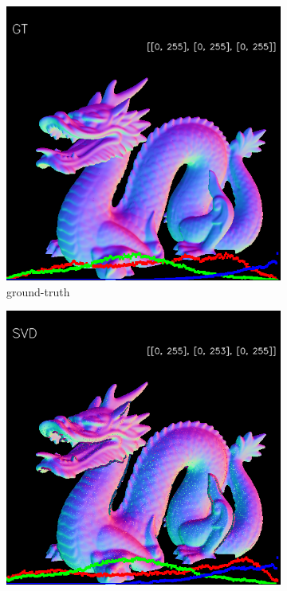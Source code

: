 \begin{figure}[h!]
	\centering
	\begin{subfigure}[b]{0.24\linewidth}
		\includegraphics[width=\linewidth]{./Figures/comparison/fancy_eval_3_groundtruth.png}
		\caption{ground-truth}
	\end{subfigure}
	\begin{subfigure}[b]{0.24\linewidth}
		\includegraphics[width=\linewidth]{./Figures/comparison/fancy_eval_3_normal_svd.png}

\end{subfigure}
\end{figure}
